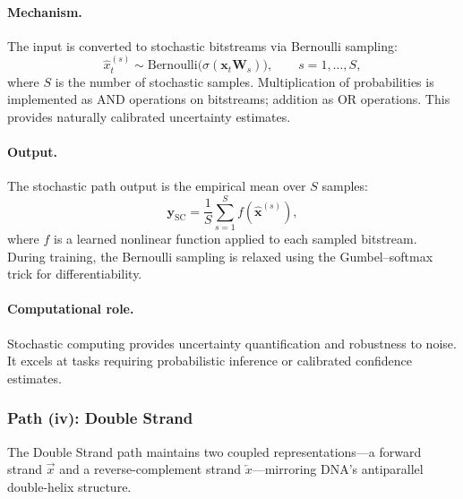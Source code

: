 \paragraph{Mechanism.} The input is converted to stochastic bitstreams via Bernoulli sampling:
\begin{equation}
\hat{x}_t^{(s)} \sim \mathrm{Bernoulli}\bigl(\sigma(\mathbf{x}_t \mathbf{W}_s)\bigr), \qquad s = 1, \ldots, S,
\label{eq:stochastic-sample}
\end{equation}
where $S$ is the number of stochastic samples. Multiplication of probabilities is implemented as AND operations on bitstreams; addition as OR operations. This provides naturally calibrated uncertainty estimates.

\paragraph{Output.} The stochastic path output is the empirical mean over $S$ samples:
\begin{equation}
\mathbf{y}_{\text{SC}} = \frac{1}{S} \sum_{s=1}^{S} f(\hat{\mathbf{x}}^{(s)}),
\label{eq:stochastic-output}
\end{equation}
where $f$ is a learned nonlinear function applied to each sampled bitstream. During training, the Bernoulli sampling is relaxed using the Gumbel--softmax trick for differentiability.

\paragraph{Computational role.} Stochastic computing provides uncertainty quantification and robustness to noise. It excels at tasks requiring probabilistic inference or calibrated confidence estimates.

\subsubsection{Path (iv): Double Strand}
\label{sec:path-double-strand}

The Double Strand path maintains two coupled representations---a forward strand $\vec{x}$ and a reverse-complement strand $\overleftarrow{x}$---mirroring DNA's antiparallel double-helix structure.

